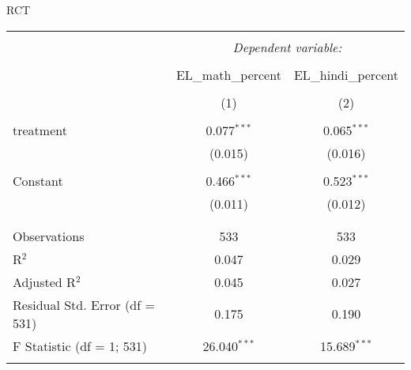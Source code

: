 \begin{homeworkProblem}{RCT}
\begin{solution}
\begin{enumerate}
                \begin{table}[!htbp] \centering 
                    \begin{tabular}{@{\extracolsep{5pt}}lcc} 
                    \\[-1.8ex]\hline 
                    \hline \\[-1.8ex] 
                    & \multicolumn{2}{c}{\textit{Dependent variable:}} \\ 
                    \cline{2-3} 
                    \\[-1.8ex] & EL\_math\_percent & EL\_hindi\_percent \\ 
                    \\[-1.8ex] & (1) & (2)\\ 
                    \hline \\[-1.8ex] 
                    treatment & 0.077$^{***}$ & 0.065$^{***}$ \\ 
                    & (0.015) & (0.016) \\ 
                    & & \\ 
                    Constant & 0.466$^{***}$ & 0.523$^{***}$ \\ 
                    & (0.011) & (0.012) \\ 
                    & & \\ 
                    \hline \\[-1.8ex] 
                    Observations & 533 & 533 \\ 
                    R$^{2}$ & 0.047 & 0.029 \\ 
                    Adjusted R$^{2}$ & 0.045 & 0.027 \\ 
                    Residual Std. Error (df = 531) & 0.175 & 0.190 \\ 
                    F Statistic (df = 1; 531) & 26.040$^{***}$ & 15.689$^{***}$ \\ 
                    \hline 
                    \hline \\[-1.8ex] 
                    \end{tabular} 
                \end{table} 

        \end{enumerate}
        

    \end{solution}

\end{homeworkProblem}